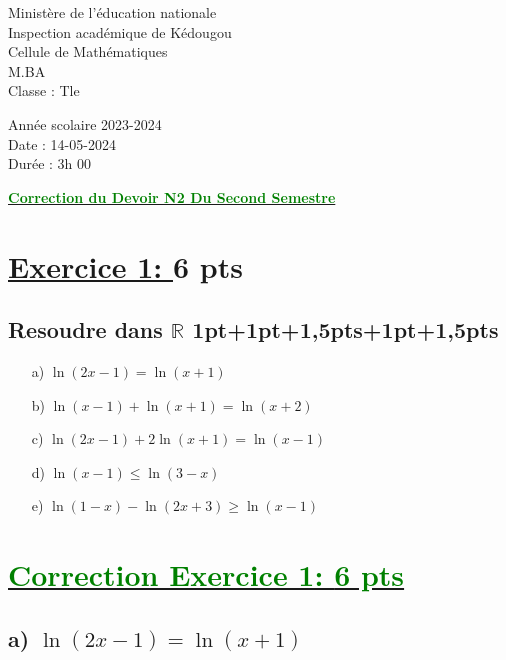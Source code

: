 \documentclass[12pt]{article}
\begin{document}
\begin{minipage}{0.5\textwidth}
	Ministère de l'éducation nationale  \\
	Inspection académique de Kédougou   \\
	Cellule de Mathématiques\\
	M.BA\\
	Classe : Tle  \\
\end{minipage}
\begin{minipage}{0.5\textwidth}
	Année scolaire 2023-2024 \\
	Date : 14-05-2024 \\
	Durée : 3h 00 \\
\end{minipage}

\begin{center}
	\textbf{{\underline{\textcolor{green}{Correction du Devoir N2 Du Second Semestre}}}}
\end{center}
\section*{\underline{Exercice 1: }\textbf{6 pts}}
\subsection*{ Resoudre dans $\mathbb{R}$ 1pt+1pt+1,5pts+1pt+1,5pts}
\begin{itemize}
\item[a)] $\ln(2x-1)=\ln(x+1)$

\item[b)] $\ln(x-1)+\ln(x+1)=\ln(x+2)$

\item[c)] $\ln(2x-1)+2\ln(x+1)=\ln(x-1)$

\item[d)] $\ln(x-1)\leq\ln(3-x)$

\item[e)] $\ln(1-x)-\ln(2x+3)\geq\ln(x-1)$
\end{itemize}
\section*{\underline{\textcolor{green}{Correction Exercice 1: \textbf{6 pts}}}}

\subsection*{a) \(\ln(2x-1)=\ln(x+1)\)}
\end{document}
